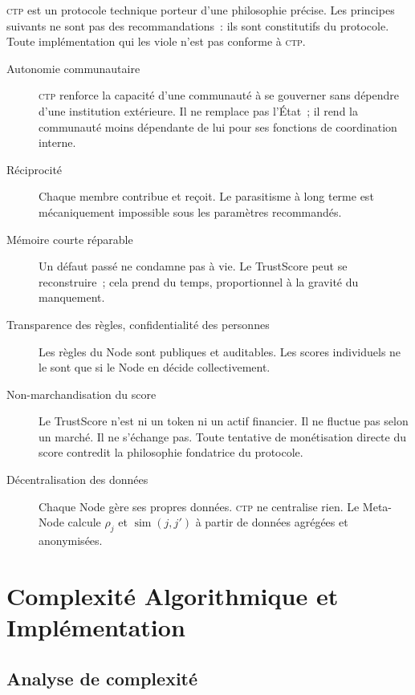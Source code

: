 \documentclass[12pt,a4paper]{article}
\theoremstyle{definition}
\theoremstyle{plain}
\theoremstyle{remark}
\newcommand{\CTP}{\textsc{ctp}}
\newcommand{\1}{\mathbf{1}}
\begin{document}
\CTP{} est un protocole technique porteur d'une philosophie précise. Les
principes suivants ne sont pas des recommandations~: ils sont constitutifs du
protocole. Toute implémentation qui les viole n'est pas conforme à \CTP{}.

\begin{description}
  \item[Autonomie communautaire] \CTP{} renforce la capacité d'une communauté
    à se gouverner sans dépendre d'une institution extérieure. Il ne remplace
    pas l'État~; il rend la communauté moins dépendante de lui pour ses
    fonctions de coordination interne.

  \item[Réciprocité] Chaque membre contribue et reçoit. Le parasitisme à long
    terme est mécaniquement impossible sous les paramètres recommandés.

  \item[Mémoire courte réparable] Un défaut passé ne condamne pas à vie.
    Le TrustScore peut se reconstruire~; cela prend du temps, proportionnel à
    la gravité du manquement.

  \item[Transparence des règles, confidentialité des personnes] Les règles du
    Node sont publiques et auditables. Les scores individuels ne le sont que
    si le Node en décide collectivement.

  \item[Non-marchandisation du score] Le TrustScore n'est ni un token ni un
    actif financier. Il ne fluctue pas selon un marché. Il ne s'échange pas.
    Toute tentative de monétisation directe du score contredit la philosophie
    fondatrice du protocole.

  \item[Décentralisation des données] Chaque Node gère ses propres données.
    \CTP{} ne centralise rien. Le Meta-Node calcule $\rho_j$ et
    $\operatorname{sim}(j,j')$ à partir de données agrégées et anonymisées.
\end{description}

\section{Complexité Algorithmique et Implémentation}
\label{sec:complexity}

\subsection{Analyse de complexité}
\end{document}
